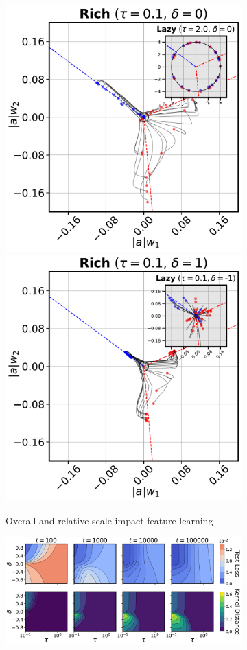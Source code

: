 \documentclass{article}
\theoremstyle{plain}
\theoremstyle{definition}
\theoremstyle{remark}
\begin{document}
\begin{figure}[t]
    \begin{subfigure}[c]{0.465\textwidth}
        \label{fig:two-layer-relu-a}
        \centering
        \includegraphics[width=0.49\linewidth]{fig/two-layer/scale.pdf}
        \includegraphics[width=0.49\linewidth]{fig/two-layer/shape.pdf}
        \caption{Overall and relative scale impact feature learning}
    \end{subfigure}
    \begin{subfigure}[c]{0.53\textwidth}
        \label{fig:two-layer-relu-b}
        \centering
        \includegraphics[width=\linewidth]{fig/two-layer/test_loss_and_kernel_distance.pdf}

\end{subfigure}
\end{figure}
\end{document}
